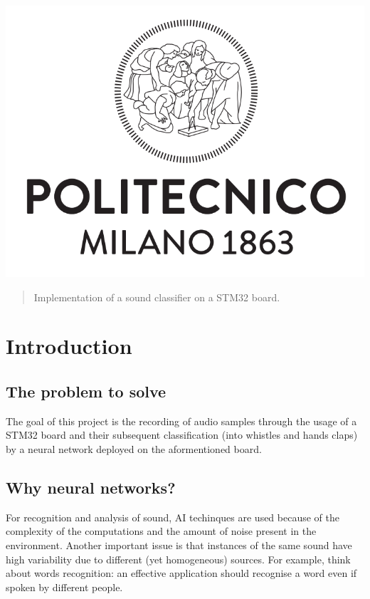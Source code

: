 \documentclass[12pt]{article}
\begin{document}
\begin{titlepage}
\begin{center}
	\includegraphics[scale=0.23]{img/Logo_Politecnico_Milano.png}                                               
\end{center}

\vfill

\end{titlepage}


\begin{abstract}
Implementation of a sound classifier on a STM32 board.
\end{abstract}

\section{Introduction}

\subsection{The problem to solve}
The goal of this project is the recording of audio samples through the usage of a STM32 board and their subsequent classification (into whistles and hands claps) by a neural network deployed on the aformentioned board.

\subsection{Why neural networks?}
For recognition and analysis of sound, AI techinques are used because of the complexity of the computations and the amount of noise present in the environment. Another important issue is that instances of the same sound have high variability due to different (yet homogeneous) sources. For example, think about words recognition: an effective application should recognise a word even if spoken by different people.
\end{document}
